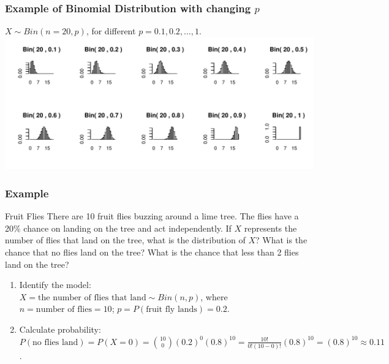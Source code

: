 \documentclass[t,xcolor=pdftex,dvipsnames,table]{beamer}
\makeatletter
\def\maxwidth{ %
  \ifdim\Gin@nat@width>\linewidth
    \linewidth
  \else
    \Gin@nat@width
  \fi
}
\newenvironment{knitrout}{}{} %
\makeatother
\begin{document}
\begin{frame}[fragile]\frametitle{Example of Binomial Distribution with changing $p$}

$X \sim Bin(n=20,p)$, for different $p=0.1,0.2,\ldots ,1$. \\

\vspace{0.5cm}
\begin{knitrout}
\color{fgcolor}
\includegraphics[width=\maxwidth]{figure/unnamed-chunk-9-1} 

\end{knitrout}

\end{frame}



\begin{frame}\frametitle{Example}
\begin{block}{Fruit Flies}
There are 10 fruit flies buzzing around a lime tree. The flies have a 20\% chance on landing on the tree and act independently.
If $X$ represents the number of flies that land on the tree, what is the distribution of $X$?  What is the chance that no flies land on the tree? What is the chance that less than 2 flies land on the tree? 

\vspace{.5cm}
\begin{enumerate}
\item Identify the model: \\
$X = \mbox{the number of flies that land} \sim Bin(n,p)$, where
$n= \mbox{number of flies} = 10$;
$p=P(\mbox{fruit fly lands}) =0.2$.
\item  
Calculate probability:\\
$P(\mbox{no flies land}) = P(X=0) = {10 \choose 0} (0.2)^0 (0.8)^{10} = \frac{10!}{0! (10-0)!} (0.8)^{10} =(0.8)^{10} \approx 0.11$.
\end{enumerate}
\end{block}
\end{frame}
\end{document}
